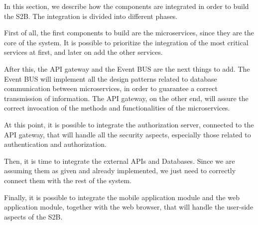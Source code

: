 
In this section, we describe how the components are integrated in order to build the S2B. The integration is divided into different phases.
\newline

First of all, the first components to build are the microservices, since they are the core of the system. It is possible to prioritize the integration of the most critical services at first, and later on add the other services.
\newline

After this, the API gateway and the Event BUS are the next things to add. The Event BUS will implement all the design patterns related to database communication between microservices, in order to guarantee a correct transmission of information. The API gateway, on the other end, will assure the correct invocation of the methods and functionalities of the microservices.
\newline

At this point, it is possible to integrate the authorization server, connected to the API gateway, that will handle all the security aspects, especially those related to authentication and authorization. 
\newline

Then, it is time to integrate the external APIs and Databases. Since we are assuming them as given and already implemented, we just need to correctly connect them with the rest of the system.
\newline

Finally, it is possible to integrate the mobile application module and the web application module, together with the web browser, that will handle the user-side aspects of the S2B.
